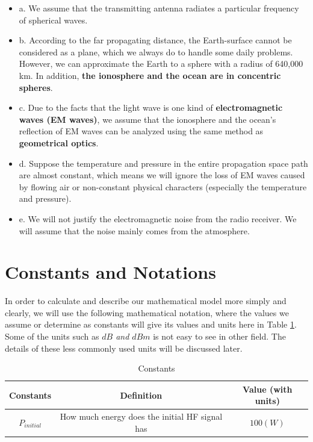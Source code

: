\documentclass{mcmthesis}
\begin{document}
    \begin{itemize}

      \item a. We assume that the transmitting antenna radiates a particular frequency of spherical waves.

      \item b. According to the far propagating distance, the Earth-surface cannot be considered as a plane, which we always do to handle some daily problems. However, we can approximate the Earth  to a sphere with a radius of 640,000 km. In addition, \textbf{the ionosphere and the ocean are in concentric spheres}.

      \item c. Due to the facts that the light wave is one kind of \textbf{electromagnetic waves (EM waves)}, we assume that the ionosphere and the ocean’s reflection of EM waves can be analyzed using the same method as \textbf{geometrical optics}.

      \item d. Suppose the temperature and pressure in the entire propagation space path are almost constant, which means we will ignore the loss of EM waves caused by flowing air or non-constant physical characters (especially the temperature and pressure).

      \item e. We will not justify the electromagnetic noise from the radio receiver. We will assume that the noise mainly comes from the atmosphere.

    \end{itemize}

\section{Constants and Notations}

    In order to calculate and describe our mathematical model more simply and clearly, we will use the following mathematical notation, where the values we assume or determine as constants will give its values and units here in Table \ref{tab:Constants}. Some of the units such as \emph{$dB$ and $dBm$} is not easy to see in other field. The details of these less commonly used units will be discussed later.

    \begin{table}[h]
      \centering
        \begin{tabular}{|c|c|c|}

          \hline Constants & Definition & Value (with units) \\
          \hline $P_{initial}$ & How much energy does the initial HF signal has & $100(W)$ \\
          \hline

        \end{tabular}
        \caption{Constants}
        \label{tab:Constants}
    \end{table}
\end{document}
